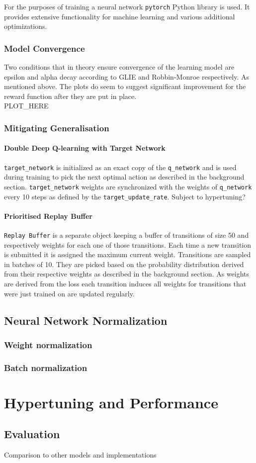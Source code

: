 For the purposes of training a neural network \texttt{pytorch}
Python library is used. It provides extensive functionality
for machine learning and various additional optimizations.

\subsection{Model Convergence}
Two conditions that in theory ensure convergence of the 
learning model are epsilon and alpha decay according to 
GLIE and Robbin-Monroe respectively. As mentioned above.
The plots do seem to suggest significant improvement for the
reward function after they are put in place.\\

PLOT\_HERE

\subsection{Mitigating Generalisation}
\subsubsection{Double Deep Q-learning with Target Network}
\texttt{target\_network} is initialized as an exact copy of the 
\texttt{q\_network} and is used during training to pick the next 
optimal action as described in the background section. 
\texttt{target\_network} weights are synchronized with the
weights of \texttt{q\_network} every 10 steps as defined by the 
\texttt{target\_update\_rate}. Subject to hypertuning?

\subsubsection{Prioritised Replay Buffer}
\texttt{Replay Buffer} is a separate object keeping a buffer
of transitions of size 50 and respectively weights for each one 
of those transitions. Each time a new transition is submitted
it is assigned the maximum current weight. Transitions are 
sampled in batches of 10. They are picked based on the 
probability distribution derived from their respective weights
as described in the background section. As weights are derived 
from the loss each transition induces all weights for 
transitions that were just trained on are updated regularly. 

\section{Neural Network Normalization}
\subsection{Weight normalization}
\subsection{Batch normalization}

\chapter{Hypertuning and Performance}
\section{Evaluation}
Comparison to other models and implementations



